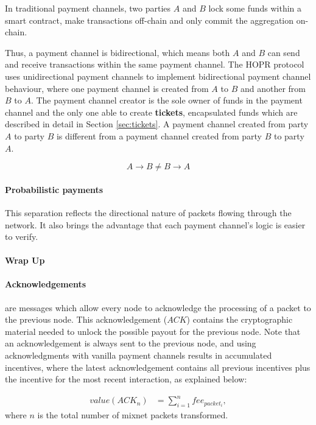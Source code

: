 In traditional payment channels, two parties $A$ and $B$ lock some funds within a smart contract, make transactions off-chain and only commit the aggregation on-chain.



Thus, a payment channel is bidirectional, which means both $A$ and $B$ can send and receive transactions within the same payment channel. The HOPR protocol uses unidirectional payment channels to implement bidirectional payment channel behaviour, where one payment channel is created from $A$ to $B$ and another from $B$ to $A$. The payment channel creator is the sole owner of funds in the payment channel and the only one able to create \textbf{tickets}, encapsulated funds which are described in detail in Section \ref{sec:tickets}. A payment channel created from party $A$ to party $B$ is different from a payment channel created from party $B$ to party $A$.

$$A\rightarrow B \neq B\rightarrow A$$

\paragraph{Probabilistic payments}

This separation reflects the directional nature of packets flowing through the network. It also brings the advantage that each payment channel's logic is easier to verify.

\paragraph{Wrap Up}

\paragraph{Acknowledgements} are messages which allow every node to acknowledge the processing of a packet to the previous node. This acknowledgement ($ACK$) contains the cryptographic material needed to unlock the possible payout for the previous node. Note that an acknowledgement is always sent to the previous node, and using acknowledgments with vanilla payment channels results in accumulated incentives, where the latest acknowledgement contains all previous incentives plus the incentive for the most recent interaction, as explained below:

\begin{align}
    value (ACK_n) & =\sum_{i=1}^nfee_{packet_i},
\end{align}
where $n$ is the total number of mixnet packets transformed.

